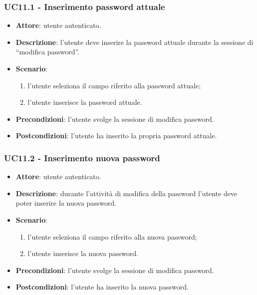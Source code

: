 \subsubsection{UC11.1 - Inserimento password attuale} 
\begin{itemize}
    \item \textbf{Attore}: utente autenticato.
    \item \textbf{Descrizione}: l'utente deve inserire la password attuale durante la sessione di “modifica password”.
    \item \textbf{Scenario}:
    \begin{enumerate}
        \item l'utente seleziona il campo riferito alla password attuale;
        \item l'utente inserisce la password attuale.
    \end{enumerate}

    \item \textbf{Precondizioni}: l'utente svolge la sessione di modifica password.
    \item \textbf{Postcondizioni}: l'utente ha inserito la propria password attuale.

\end{itemize}

\subsubsection{UC11.2 - Inserimento nuova password}
\begin{itemize}
    \item \textbf{Attore}: utente autenticato.
    \item \textbf{Descrizione}: durante l'attività di modifica della password l'utente deve poter inserire la nuova password.
    \item \textbf{Scenario}:
    \begin{enumerate}
        \item l'utente seleziona il campo riferito alla nuova password;
        \item l'utente inserisce la nuova password.
    \end{enumerate}

    \item \textbf{Precondizioni}: l'utente svolge la sessione di modifica password.
    \item \textbf{Postcondizioni}: l'utente ha inserito la nuova password.
\end{itemize}

